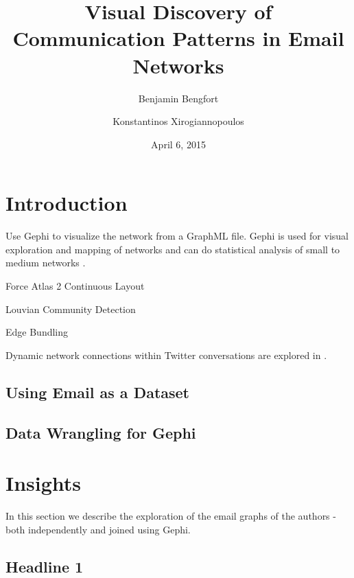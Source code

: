 \documentclass[11pt,letterpaper]{article}
\begin{document}
\title{Visual Discovery of Communication Patterns in Email Networks}

\author[ ]{Benjamin Bengfort}
\author[ ]{Konstantinos Xirogiannopoulos}

\date{April 6, 2015}

\maketitle

\section*{Introduction}

Use Gephi \cite{gephi_gephi-open_2010} to visualize the network from a GraphML \cite{brandes_graph_2010} file. Gephi is used for visual exploration and mapping of networks \cite{bastian_gephi:_2009} and can do statistical analysis of small to medium networks \cite{mcsweeney_gephi_2009}.

Force Atlas 2 Continuous Layout \cite{jacomy_forceatlas2_2014}

Louvian Community Detection \cite{de_meo_generalized_2011}

Edge Bundling \cite{pupyrev_edge_2012}

Dynamic network connections within Twitter conversations are explored in \cite{bruns_how_2012}.

\subsection*{Using Email as a Dataset}

\subsection*{Data Wrangling for Gephi}

\section*{Insights}

In this section we describe the exploration of the email graphs of the authors - both independently and joined using Gephi.

\subsection*{Headline 1}
\end{document}
